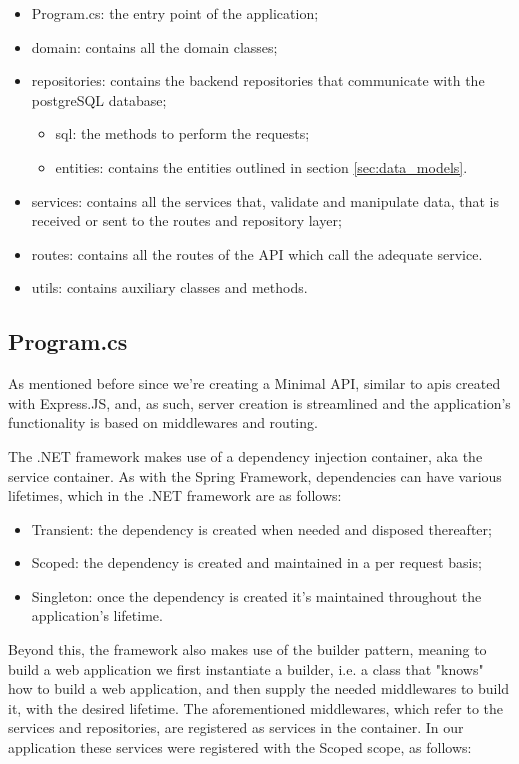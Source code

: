 \begin{itemize}
 \item Program.cs: the entry point of the application;
 \item domain: contains all the domain classes;
 \item repositories: contains the backend repositories that communicate with the postgreSQL database;
 \begin{itemize}
 	\item sql: the methods to perform the requests;
 	\item entities: contains the entities outlined in section \ref{sec:data_models}.
 \end{itemize}
 \item services: contains all the services that, validate and manipulate data, that is received or sent to the routes and repository layer;
 \item routes: contains all the routes of the API which call the adequate service.
 \item utils: contains auxiliary classes and methods.
\end{itemize}

\subsection{Program.cs}

As mentioned before since we're creating a Minimal API, similar to apis created with Express.JS, and, as such, server creation is streamlined and the application's functionality is based on middlewares and routing.

The .NET framework makes use of a dependency injection container, aka the service container. As with the Spring Framework, dependencies can have various lifetimes, which in the .NET framework are as follows:
\begin{itemize}
	\item Transient: the dependency is created when needed and disposed thereafter;
	\item Scoped: the dependency is created and maintained in a per request basis;
	\item Singleton: once the dependency is created it's maintained throughout the application's lifetime. 
\end{itemize}
Beyond this, the framework also makes use of the builder pattern, meaning to build a web application we first instantiate a builder, i.e. a class that "knows" how to build a web application, and then supply the needed middlewares to build it, with the desired lifetime.
The aforementioned middlewares, which refer to the services and repositories, are registered as services in the container. In our application these services were registered with the Scoped scope, as follows:

